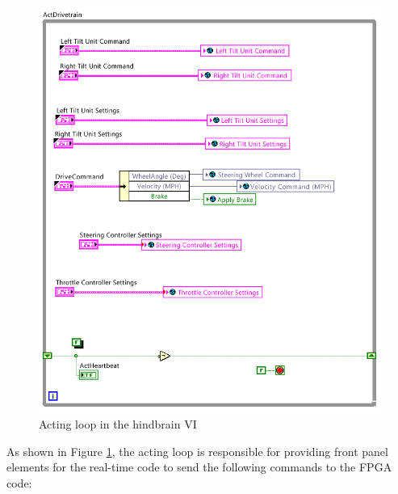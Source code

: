 \newpage

\begin{figure}[h!]
\centering
\includegraphics[scale=1.5]{Photos/actloop.png}
\caption{Acting loop in the hindbrain VI}
\label{fig:actloop}
\end{figure}

\noindent As shown in Figure \ref{fig:actloop}, the acting loop is responsible for providing front panel elements for the real-time code to send the following commands to the FPGA code:

